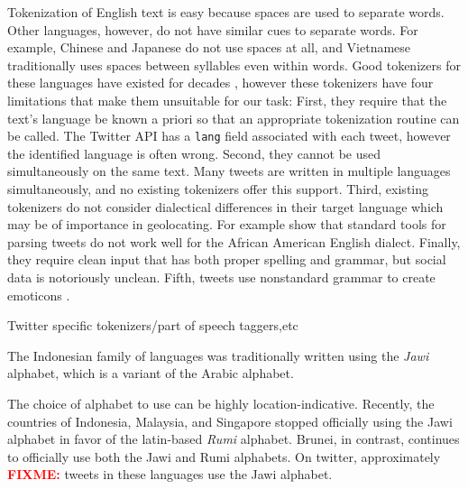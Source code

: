 \documentclass[sigconf,10pt]{acmart}
\newcommand{\str}[1]{\texttt{#1}}
\newcommand{\defn}[1]{\textit{#1}}
\newcommand{\fixme}[1]{\textcolor{red}{\textbf{FIXME:} {#1}}}
\begin{document}
\begin{description}[style=unboxed,leftmargin=0cm]
    \item[Tokenization in multilingual corpora is difficult.]
        Tokenization of English text is easy because spaces are used to separate words.
        Other languages, however, do not have similar cues to separate words.
        For example, Chinese and Japanese do not use spaces at all,
        and Vietnamese traditionally uses spaces between syllables even within words.
        Good tokenizers for these languages have existed for decades \citep[e.g.][]{fung1998extracting,huyen2008hybrid},
        however these tokenizers have four limitations that make them unsuitable for our task:
        First, they require that the text's language be known a priori so that an appropriate tokenization routine can be called.
        The Twitter API has a \str{lang} field associated with each tweet,
        however the identified language is often wrong.
        Second, they cannot be used simultaneously on the same text.
        Many tweets are written in multiple languages simultaneously,
        and no existing tokenizers offer this support.
        Third, existing tokenizers do not consider dialectical differences in their target language which may be of importance in geolocating.
        For example \citet{blodgett2016demographic} show that standard tools for parsing tweets do not work well for the African American English dialect.
        Finally, they require clean input that has both proper spelling and grammar,
        but social data is notoriously unclean.
        Fifth, tweets use nonstandard grammar to create emoticons \citep{}.

        Twitter specific tokenizers/part of speech taggers,etc\citep{o2010tweetmotif,gimpel2011part,owoputi2013improved}

    \item[Many languages use multiple writing systems.]
        The Indonesian family of languages was traditionally written using the \defn{Jawi} alphabet,
        which is a variant of the Arabic alphabet.

        The choice of alphabet to use can be highly location-indicative.
        Recently, the countries of Indonesia, Malaysia, and Singapore stopped officially using the Jawi alphabet in favor of the latin-based \defn{Rumi} alphabet.
        Brunei, in contrast, continues to officially use both the Jawi and Rumi alphabets.
        On twitter, approximately \fixme{} tweets in these languages use the Jawi alphabet.


\end{description}
\end{document}
